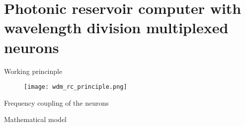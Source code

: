 \section[Photonic RC with frequency multiplexed neurons]{Photonic reservoir computer with wavelength division multiplexed neurons}

\begin{frame}{Working princinple}
	\begin{figure}
		\centering
		\texttt{[image: wdm\_rc\_principle.png]}
	\end{figure}
\end{frame}

\begin{frame}{Frequency coupling of the neurons}
	
\end{frame}

\begin{frame}{Mathematical model}
	
\end{frame}